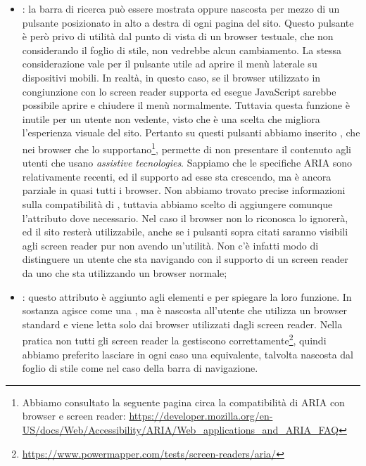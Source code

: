 \documentclass[12pt]{article}
\begin{document}
\begin{itemize}
		\item \textbf{}: la barra di ricerca può essere mostrata oppure nascosta per mezzo di un pulsante posizionato in alto a destra di ogni pagina del sito. Questo pulsante è però privo di utilità dal punto di vista di un browser testuale, che non considerando il foglio di stile, non vedrebbe alcun cambiamento. La stessa considerazione vale per il pulsante utile ad aprire il menù laterale su dispositivi mobili. In realtà, in questo caso, se il browser utilizzato in congiunzione con lo screen reader supporta ed esegue JavaScript sarebbe possibile aprire e chiudere il menù normalmente. Tuttavia questa funzione è inutile per un utente non vedente, visto che è una scelta che migliora l'esperienza visuale del sito. Pertanto su questi pulsanti abbiamo inserito , che nei browser che lo supportano\footnote{Abbiamo consultato la seguente pagina circa la compatibilità di ARIA con browser e screen reader: \url{https://developer.mozilla.org/en-US/docs/Web/Accessibility/ARIA/Web_applications_and_ARIA_FAQ}}, 
		permette di non presentare il contenuto agli utenti che usano \textit{assistive tecnologies}. Sappiamo che le specifiche ARIA sono relativamente recenti, ed il supporto ad esse sta crescendo, ma è ancora parziale in quasi tutti i browser. Non abbiamo trovato precise informazioni sulla compatibilità di , tuttavia abbiamo scelto di aggiungere comunque l'attributo dove necessario. Nel caso il browser non lo riconosca lo ignorerà, ed il sito resterà utilizzabile, anche se i pulsanti sopra citati saranno visibili agli screen reader pur non avendo un'utilità. Non c'è infatti modo di distinguere un utente che sta navigando con il supporto di un screen reader da uno che sta utilizzando un browser normale;
		\item \textbf{}: questo attributo è aggiunto agli elementi  e  per spiegare la loro funzione. In sostanza agisce come una , ma è nascosta all'utente che utilizza un browser standard e viene letta solo dai browser utilizzati dagli screen reader. Nella pratica non tutti gli screen reader la gestiscono correttamente\footnote{\url{https://www.powermapper.com/tests/screen-readers/aria/}}, quindi abbiamo preferito lasciare in ogni caso una  equivalente, talvolta nascosta dal foglio di stile come nel caso della barra di navigazione.
		
	\end{itemize}
\end{document}
